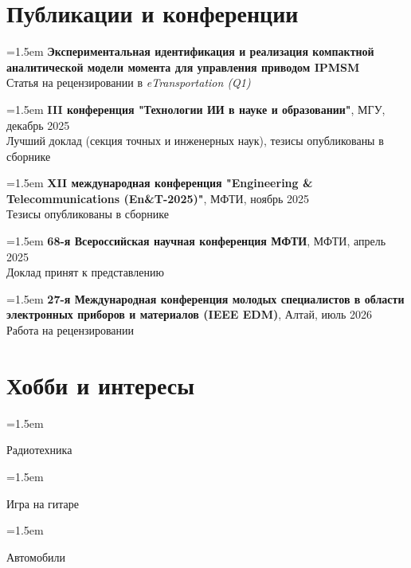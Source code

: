 \documentclass[12pt]{article}
\newcommand{\mainColor}{Blue}
\newcommand{\shspace}{\hspace*{0.5em}}
\newcommand{\negshspace}{\hspace*{-0.5em}}
\newcommand{\neghvspace}{\vspace*{-1.5em}}
\newcommand{\svspace}{\vspace*{0.5em}}
\newcommand{\boxAwesome}[1]{
   \makebox[1.50em][c]{
      #1
   }
}
\newcommand{\cvsection}[2]{
    \section*{
        \color{\mainColor} \boxAwesome{#1} \negshspace #2
    }
}
\newcommand{\simpleSkill}[1]{
    \noindent\hangindent=1.5em\hangafter=0
    \faAngleRight
    \shspace
    #1
    \svspace
    \par
}
\newcommand{\hobby}[2]{
    \noindent\hangindent=1.5em\hangafter=0
    \faAngleRight
    \shspace
    \boxAwesome{#1} #2
    \svspace
    \par
}
\begin{document}
\neghvspace
\cvsection{\faBookOpen}{Публикации и конференции}
\svspace

\simpleSkill{\textbf{Экспериментальная идентификация и реализация компактной аналитической модели момента для управления приводом IPMSM} \\
Статья на рецензировании в \textit{eTransportation (Q1)}}

\simpleSkill{\textbf{III конференция "Технологии ИИ в науке и образовании"}, МГУ, декабрь 2025 \\
Лучший доклад (секция точных и инженерных наук), тезисы опубликованы в сборнике}

\simpleSkill{\textbf{XII международная конференция "Engineering \& Telecommunications (En\&T-2025)"}, МФТИ, ноябрь 2025 \\
Тезисы опубликованы в сборнике}

\simpleSkill{\textbf{68-я Всероссийская научная конференция МФТИ}, МФТИ, апрель 2025 \\
Доклад принят к представлению}

\simpleSkill{\textbf{27-я Международная конференция молодых специалистов в области электронных приборов и материалов (IEEE EDM)}, Алтай, июль 2026 \\
Работа на рецензировании}

    \neghvspace
    \svspace
    \cvsection{\faPuzzlePiece}{Хобби и интересы}
    \svspace

    \hobby{\faTv}{Радиотехника}
    \hobby{\faGuitar}{Игра на гитаре}
    \hobby{\faCar}{Автомобили}
\end{document}
